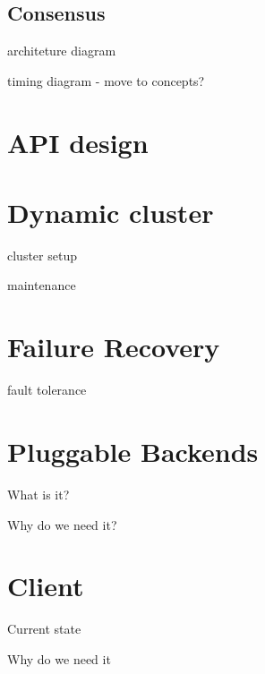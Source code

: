 \subsection{Consensus}

{architeture diagram}

{timing diagram} - move to concepts?

\section{API design}

\section{Dynamic cluster}

cluster setup

maintenance

\section{Failure Recovery}

fault tolerance

\section{Pluggable Backends}

What is it?

Why do we need it?

\section{Client}

Current state

Why do we need it


